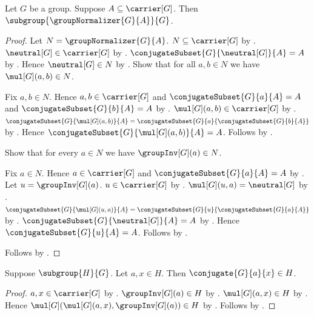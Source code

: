 \begin{theorem}\label{group_normalizer_subgroup}
    Let $G$ be a group.
    Suppose $A\subseteq\carrier[G]$.
    Then $\subgroup{\groupNormalizer{G}{A}}{G}$.
\end{theorem}
\begin{proof}
    Let $N=\groupNormalizer{G}{A}$.
    $N\subseteq\carrier[G]$ by
        .
    $\neutral[G]\in\carrier[G]$ by
        .
    $\conjugateSubset{G}{\neutral[G]}{A}=A$ by
        .
    Hence $\neutral[G]\in N$ by
        .
    Show that for all $a,b\in N$ we have $\mul[G](a,b)\in N$.
    \begin{subproof}
        Fix $a,b\in N$.
        Hence $a,b\in\carrier[G]$ and
            $\conjugateSubset{G}{a}{A}=A$ and
            $\conjugateSubset{G}{b}{A}=A$ by
            .
        $\mul[G](a,b)\in\carrier[G]$ by
            .
        $\conjugateSubset{G}{\mul[G](a,b)}{A}=
            \conjugateSubset{G}{a}{\conjugateSubset{G}{b}{A}}$ by
            .
        Hence $\conjugateSubset{G}{\mul[G](a,b)}{A}=A$.
        Follows by .
    \end{subproof}
    Show that for every $a\in N$ we have $\groupInv[G](a)\in N$.
    \begin{subproof}
        Fix $a\in N$.
        Hence $a\in\carrier[G]$ and
            $\conjugateSubset{G}{a}{A}=A$ by
            .
        Let $u=\groupInv[G](a)$.
        $u\in\carrier[G]$ by .
        $\mul[G](u,a)=\neutral[G]$ by
            .
        $\conjugateSubset{G}{\mul[G](u,a)}{A}=
            \conjugateSubset{G}{u}{\conjugateSubset{G}{a}{A}}$ by
            .
        $\conjugateSubset{G}{\neutral[G]}{A}=A$ by
            .
        Hence $\conjugateSubset{G}{u}{A}=A$.
        Follows by .
    \end{subproof}
    Follows by .
\end{proof}

\begin{proposition}\label{subgroup_closed_under_internal_conjugation}
    Suppose $\subgroup{H}{G}$.
    Let $a,x\in H$.
    Then $\conjugate{G}{a}{x}\in H$.
\end{proposition}
\begin{proof}
    $a,x\in\carrier[G]$ by
        .
    $\groupInv[G](a)\in H$ by .
    $\mul[G](a,x)\in H$ by .
    Hence
        $\mul[G](\mul[G](a,x),\groupInv[G](a))\in H$ by
        .
    Follows by .
\end{proof}

